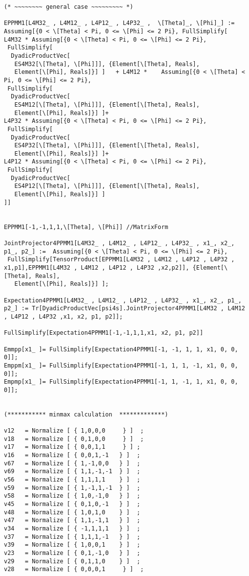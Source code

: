 \documentclass[%
  twocolumn,
 showpacs,
 showkeys,
 preprintnumbers,
 amsmath,amssymb,
 aps,
  pra,
  longbibliography,
 floatfix,
 ]{revtex4-1}
\begin{document}
{\begin{lstlisting}[backgroundcolor=\color{yellow!10},framerule=0pt,breaklines=true, frame=tb]
(* ~~~~~~~~ general case ~~~~~~~~~ *)

EPPMM1[L4M32_ , L4M12_ , L4P12_ , L4P32_ ,  \[Theta]_, \[Phi]_] :=   Assuming[{0 < \[Theta] < Pi, 0 <= \[Phi] <= 2 Pi}, FullSimplify[
L4M32 * Assuming[{0 < \[Theta] < Pi, 0 <= \[Phi] <= 2 Pi},
 FullSimplify[
  DyadicProductVec[
   ES4M32[\[Theta], \[Phi]]], {Element[\[Theta], Reals],
   Element[\[Phi], Reals]}] ]   + L4M12 *    Assuming[{0 < \[Theta] < Pi, 0 <= \[Phi] <= 2 Pi},
 FullSimplify[
  DyadicProductVec[
   ES4M12[\[Theta], \[Phi]]], {Element[\[Theta], Reals],
   Element[\[Phi], Reals]}] ]+
L4P32 * Assuming[{0 < \[Theta] < Pi, 0 <= \[Phi] <= 2 Pi},
 FullSimplify[
  DyadicProductVec[
   ES4P32[\[Theta], \[Phi]]], {Element[\[Theta], Reals],
   Element[\[Phi], Reals]}] ]+
L4P12 * Assuming[{0 < \[Theta] < Pi, 0 <= \[Phi] <= 2 Pi},
 FullSimplify[
  DyadicProductVec[
   ES4P12[\[Theta], \[Phi]]], {Element[\[Theta], Reals],
   Element[\[Phi], Reals]}] ]
]]


EPPMM1[-1,-1,1,1,\[Theta], \[Phi]] //MatrixForm

JointProjector4PPMM1[L4M32_ , L4M12_ , L4P12_ , L4P32_ , x1_, x2_, p1_, p2_] :=  Assuming[{0 < \[Theta] < Pi, 0 <= \[Phi] <= 2 Pi},
 FullSimplify[TensorProduct[EPPMM1[L4M32 , L4M12 , L4P12 , L4P32 , x1,p1],EPPMM1[L4M32 , L4M12 , L4P12 , L4P32 ,x2,p2]], {Element[\[Theta], Reals],
   Element[\[Phi], Reals]}] ];

Expectation4PPMM1[L4M32_ , L4M12_ , L4P12_ , L4P32_ , x1_, x2_, p1_, p2_] := Tr[DyadicProductVec[psi4s].JointProjector4PPMM1[L4M32 , L4M12 , L4P12 , L4P32 ,x1, x2, p1, p2]];

FullSimplify[Expectation4PPMM1[-1,-1,1,1,x1, x2, p1, p2]]

Emmpp[x1_ ]= FullSimplify[Expectation4PPMM1[-1, -1, 1, 1, x1, 0, 0, 0]];
Emppm[x1_ ]= FullSimplify[Expectation4PPMM1[-1, 1, 1, -1, x1, 0, 0, 0]];
Empmp[x1_ ]= FullSimplify[Expectation4PPMM1[-1, 1, -1, 1, x1, 0, 0, 0]];


(*********** minmax calculation  *************)

v12   = Normalize [ { 1,0,0,0     } ]  ;
v18   = Normalize [ { 0,1,0,0     } ]  ;
v17   = Normalize [ { 0,0,1,1     } ] ;
v16   = Normalize [ { 0,0,1,-1   } ]  ;
v67   = Normalize [ { 1,-1,0,0   } ]  ;
v69   = Normalize [ { 1,1,-1,-1  } ]  ;
v56   = Normalize [ { 1,1,1,1    } ]  ;
v59   = Normalize [ { 1,-1,1,-1  } ]  ;
v58   = Normalize [ { 1,0,-1,0   } ]  ;
v45   = Normalize [ { 0,1,0,-1   } ]  ;
v48   = Normalize [ { 1,0,1,0    } ]  ;
v47   = Normalize [ { 1,1,-1,1   } ]  ;
v34   = Normalize [ { -1,1,1,1   } ]  ;
v37   = Normalize [ { 1,1,1,-1   } ]  ;
v39   = Normalize [ { 1,0,0,1    } ]  ;
v23   = Normalize [ { 0,1,-1,0   } ]  ;
v29   = Normalize [ { 0,1,1,0    } ]  ;
v28   = Normalize [ { 0,0,0,1     } ]  ;


\end{lstlisting}}
\end{document}
